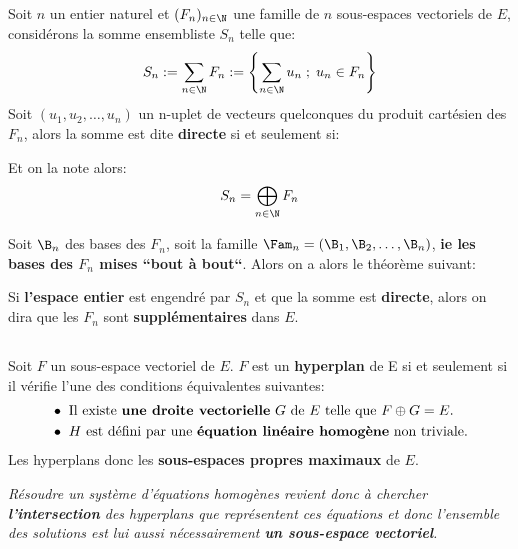 \subsection*{}
Soit \(n\) un entier naturel et \((F_n)_{n \in \N}\) une famille de \(n\) sous-espaces vectoriels de \(E\), considérons la somme ensembliste \(S_n\) telle que:
\[
    S_n := \sum_{n\in\N} F_n := \Biggl\{ \sum_{n\in\N} u_n \; ; \; u_n \in F_n\Biggl\}
\]
Soit \((u_1, u_2, \ldots, u_n)\) un n-uplet de vecteurs quelconques du produit cartésien des \(F_n\), alors la somme est dite \textbf{directe} si et seulement si:

Et on la note alors:
\[
    S_n = \bigoplus_{n\in\N} F_n
\]

Soit \(\B_n\) des bases des \(F_n\), soit la famille \(\Fam_n = (\B_1, \B_2, \ldots, \B_n)\), \textbf{ie les bases des \(F_n\) mises ``bout à bout``}.\+
Alors on a alors le théorème suivant:

Si \textbf{l'espace entier} est engendré par \(S_n\) et que la somme est \textbf{directe}, alors on dira que les \(F_n\) sont \textbf{supplémentaires} dans \(E\).
    
\subsection*{}
Soit \(F\) un sous-espace vectoriel de \(E\).\+
\(F\) est un \textbf{hyperplan} de E si et seulement si il vérifie l'une des conditions équivalentes suivantes:
\begin{align*}
    &\bullet \text{ Il existe \textbf{une droite vectorielle} \(G\) de \(E\) telle que \(F \oplus G = E\).} \\
    &\bullet \text{ \(H\) est défini par une \textbf{équation linéaire homogène} non triviale.}
\end{align*}
Les hyperplans donc les \textbf{sous-espaces propres maximaux} de \(E\).

\begin{center}
    \textit{
        Résoudre un système d'équations homogènes revient donc à chercher \textbf{l'intersection} des hyperplans que représentent ces équations et donc l'ensemble des solutions est lui aussi nécessairement \textbf{un sous-espace vectoriel}.
    }
\end{center}
